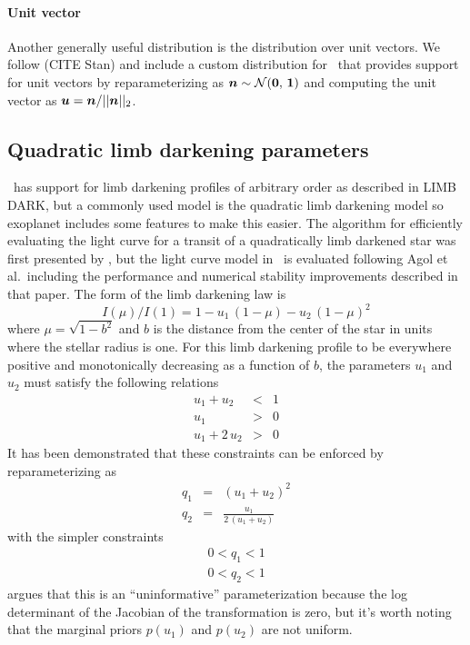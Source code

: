 \documentclass[modern]{aastex62}
\begin{document}
\paragraph{Unit vector}

Another generally useful distribution is the distribution over unit vectors.
We follow (CITE Stan) and include a custom distribution for \pymc\ that provides support for unit vectors by reparameterizing as ${\boldsymbol{n}} \sim \mathcal{N}({\boldsymbol{0}},\,{\boldsymbol{1}})$ and computing the unit vector as ${\boldsymbol{u}} = {\boldsymbol{n}} / || {\boldsymbol{n}} ||_{2}$.


\subsection{Quadratic limb darkening parameters}

\exoplanet\ has support for limb darkening profiles of arbitrary order as described in LIMB DARK, but a commonly used model is the quadratic limb darkening model so exoplanet includes some features to make this easier.
The algorithm for efficiently evaluating the light curve for a transit of a quadratically limb darkened star was first presented by \citet{Mandel:2002}, but the light curve model in \exoplanet\ is evaluated following Agol et al.\ including the performance and numerical stability improvements described in that paper.
The form of the limb darkening law is
\begin{equation}
I(\mu)/I(1) = 1 - u_1\,(1 - \mu) - u_2\,(1 - \mu)^2
\end{equation}
where $\mu = \sqrt{1 - b^2}$ and $b$ is the distance from the center of the star in units where the stellar radius is one.
For this limb darkening profile to be everywhere positive and monotonically decreasing as a function of $b$, the parameters $u_1$ and $u_2$ must satisfy the following relations
\begin{eqnarray}
u_1 + u_2 &<& 1 \\
u_1 &>& 0 \\
u_1 + 2\,u_2 &>& 0
\end{eqnarray}
It has been demonstrated \citep[by][]{Kipping:2013} that these constraints can be enforced by reparameterizing as
\begin{eqnarray}
q_1 &=& (u_1 + u_2)^2 \\
q_2 &=& \frac{u_1}{2\,(u_1 + u_2)}
\end{eqnarray}
with the simpler constraints
\begin{eqnarray}
0 < q_1 < 1 \\
0 < q_2 < 1
\end{eqnarray}
\citet{Kipping:2013} argues that this is an ``uninformative'' parameterization because the log determinant of the Jacobian of the transformation is zero,  but it's worth noting that the marginal priors $p(u_1)$ and $p(u_2)$ are not uniform.
\end{document}
